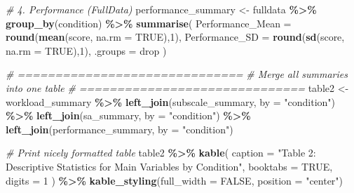 \documentclass[
]{article}
\newenvironment{Shaded}{\begin{snugshade}}{\end{snugshade}}
\newcommand{\AttributeTok}[1]{\textcolor[rgb]{0.13,0.29,0.53}{#1}}
\newcommand{\CommentTok}[1]{\textcolor[rgb]{0.56,0.35,0.01}{\textit{#1}}}
\newcommand{\ConstantTok}[1]{\textcolor[rgb]{0.56,0.35,0.01}{#1}}
\newcommand{\DecValTok}[1]{\textcolor[rgb]{0.00,0.00,0.81}{#1}}
\newcommand{\FunctionTok}[1]{\textcolor[rgb]{0.13,0.29,0.53}{\textbf{#1}}}
\newcommand{\NormalTok}[1]{#1}
\newcommand{\OtherTok}[1]{\textcolor[rgb]{0.56,0.35,0.01}{#1}}
\newcommand{\SpecialCharTok}[1]{\textcolor[rgb]{0.81,0.36,0.00}{\textbf{#1}}}
\newcommand{\StringTok}[1]{\textcolor[rgb]{0.31,0.60,0.02}{#1}}
\begin{document}
\begin{Shaded}
\begin{Highlighting}[]
\CommentTok{\# 4. Performance (FullData)}
\NormalTok{performance\_summary }\OtherTok{\textless{}{-}}\NormalTok{ fulldata }\SpecialCharTok{\%\textgreater{}\%}
  \FunctionTok{group\_by}\NormalTok{(condition) }\SpecialCharTok{\%\textgreater{}\%}
  \FunctionTok{summarise}\NormalTok{(}
    \AttributeTok{Performance\_Mean =} \FunctionTok{round}\NormalTok{(}\FunctionTok{mean}\NormalTok{(score, }\AttributeTok{na.rm =} \ConstantTok{TRUE}\NormalTok{),}\DecValTok{1}\NormalTok{),}
    \AttributeTok{Performance\_SD   =} \FunctionTok{round}\NormalTok{(}\FunctionTok{sd}\NormalTok{(score, }\AttributeTok{na.rm =} \ConstantTok{TRUE}\NormalTok{),}\DecValTok{1}\NormalTok{),}
    \AttributeTok{.groups =} \StringTok{\textquotesingle{}drop\textquotesingle{}}
\NormalTok{  )}

\CommentTok{\# ==============================}
\CommentTok{\# Merge all summaries into one table}
\CommentTok{\# ==============================}
\NormalTok{table2 }\OtherTok{\textless{}{-}}\NormalTok{ workload\_summary }\SpecialCharTok{\%\textgreater{}\%}
  \FunctionTok{left\_join}\NormalTok{(subscale\_summary, }\AttributeTok{by =} \StringTok{"condition"}\NormalTok{) }\SpecialCharTok{\%\textgreater{}\%}
  \FunctionTok{left\_join}\NormalTok{(sa\_summary, }\AttributeTok{by =} \StringTok{"condition"}\NormalTok{) }\SpecialCharTok{\%\textgreater{}\%}
  \FunctionTok{left\_join}\NormalTok{(performance\_summary, }\AttributeTok{by =} \StringTok{"condition"}\NormalTok{)}

\CommentTok{\# Print nicely formatted table}
\NormalTok{table2 }\SpecialCharTok{\%\textgreater{}\%}
  \FunctionTok{kable}\NormalTok{(}
    \AttributeTok{caption =} \StringTok{"Table 2: Descriptive Statistics for Main Variables by Condition"}\NormalTok{,}
    \AttributeTok{booktabs =} \ConstantTok{TRUE}\NormalTok{,}
    \AttributeTok{digits =} \DecValTok{1}
\NormalTok{  ) }\SpecialCharTok{\%\textgreater{}\%}
  \FunctionTok{kable\_styling}\NormalTok{(}\AttributeTok{full\_width =} \ConstantTok{FALSE}\NormalTok{, }\AttributeTok{position =} \StringTok{"center"}\NormalTok{)}
\end{Highlighting}
\end{Shaded}
\end{document}
